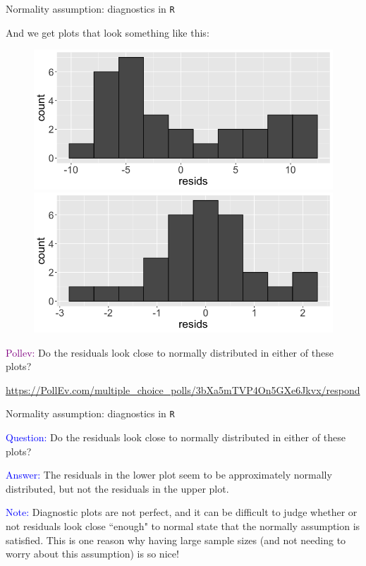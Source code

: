 \documentclass[10pt,t]{beamer}
\begin{document}
\begin{frame}{Normality assumption: diagnostics in \texttt{R}}
	
	\vspace{-5 mm}
	
And we get plots that look something like this:

	
\begin{figure}
	\centering 
	\includegraphics[scale=0.2]{figures/hist_resid1.png} \\
    \includegraphics[scale=0.2]{figures/hist_resid2.png}
\end{figure}

\textcolor{purple}{Pollev:} Do the residuals look close to normally distributed in either of these plots?
\smallskip

\footnotesize{\url{https://PollEv.com/multiple_choice_polls/3bXa5mTVP4On5GXe6Jkvx/respond}}

\end{frame}

\begin{frame}{Normality assumption: diagnostics in \texttt{R}}

\textcolor{blue}{Question:} Do the residuals look close to normally distributed in either of these plots?

\vspace{0.3cm}

\textcolor{blue}{Answer:} The residuals in the lower plot seem to be approximately normally distributed, but not the residuals in the upper plot.

\vspace{0.3cm}

\textcolor{blue}{Note:} Diagnostic plots are not perfect, and it can be difficult to judge whether or not residuals look close ``enough" to normal state that the normally assumption is satisfied. This is one reason why having large sample sizes (and not needing to worry about this assumption) is so nice!

\end{frame}
\end{document}
